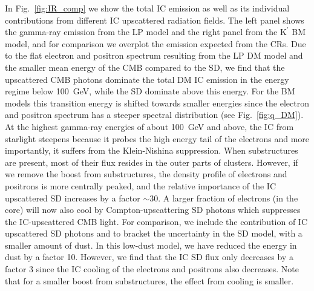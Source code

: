 \documentclass[10pt,aps,pra,reprint,amsmath,amsfonts,amssymb,showpacs,nofootinbib,floatfix]{revtex4-1}
\def\del#1{{}}
\newcommand{\rmn}{\mathrm}
\newcommand{\Kp}{\rmn{K}^\prime}
\begin{document}
In Fig.~\ref{fig:IR_comp} we show the total IC emission as well as its
individual contributions from different IC upscattered radiation
fields. The left panel shows the gamma-ray emission from the LP model
and the right panel from the $\Kp$ BM model, and for comparison we
overplot the emission expected from the CRs. Due to the flat electron
and positron spectrum resulting from the LP DM model and the smaller
mean energy of the CMB compared to the SD, we find that the
upscattered CMB photons dominate the total DM IC emission in the
energy regime below 100~GeV, while the SD dominate above this
energy. For the BM models this transition energy is shifted towards
smaller energies since the electron and positron spectrum has a
steeper spectral distribution (see Fig.~\ref{fig:q_DM}). At the
highest gamma-ray energies of about 100~GeV and above, the IC from
starlight steepens because it probes the high energy tail of the
electrons and more importantly, it suffers from the Klein-Nishina
suppression. When substructures are present, most of their flux
resides in the outer parts of clusters. However, if we remove the
boost from substructures, the density profile of electrons and
positrons is more centrally peaked, and the relative importance of the
IC upscattered SD increases by a factor $\sim 30$.  A larger fraction
of electrons (in the core) will now also cool by Compton-upscattering
SD photons which suppresses the IC-upscattered CMB light.  For
comparison, we include the contribution of IC upscattered SD photons
and to bracket the uncertainty in the SD model, with a smaller amount of
dust. In this low-dust model, we have reduced the energy in dust by a
factor 10. However, we find that the IC SD flux only decreases by a
factor 3 since the IC cooling of the electrons and positrons also
decreases. Note that for a smaller boost from substructures, the
effect from cooling is smaller.

 \del{This
  suppression is also seen in the relative normalization of the flux
  where the IC from both CMB and dust photons are lower compared to
  the starlight simply because the starlight has a higher energy,
  hence it is upscattered by more abundant low energy electrons and
  positrons (c.f. Fig.~\ref{fig:q_DM}).}
\del{Even though the SD component seems to be suppressed compared to
  the CMB at energies around 100~MeV, it has a relative large impact
  on the steady state electron spectrum. If we remove the SD cooling,
  we find a factor two larger IC flux at low energies for a cluster of
  the size of Fornax. For more massive clusters we expect a larger IC
  flux from the SD component, but a smaller contribution from the CMB
  because of the more effective cooling.}
\end{document}
